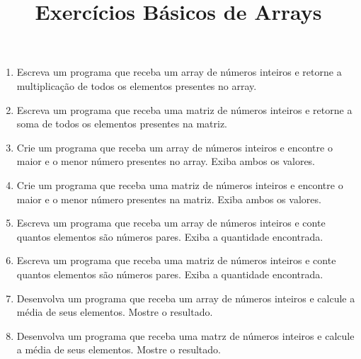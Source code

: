 \documentclass{article}
\title{Exercícios Básicos de Arrays}
\author{}
\date{}
\begin{document}
\maketitle

\begin{enumerate}
    \item Escreva um programa que receba um array de números inteiros e retorne a multiplicação de todos os elementos presentes no array.
    \item Escreva um programa que receba uma matriz de números inteiros e retorne a soma de todos os elementos presentes na matriz.
    \item Crie um programa que receba um array de números inteiros e encontre o maior e o menor número presentes no array. Exiba ambos os valores.
    \item Crie um programa que receba uma matriz de números inteiros e encontre o maior e o menor número presentes na matriz. Exiba ambos os valores.
    \item Escreva um programa que receba um array de números inteiros e conte quantos elementos são números pares. Exiba a quantidade encontrada.
    \item Escreva um programa que receba uma matriz de números inteiros e conte quantos elementos são números pares. Exiba a quantidade encontrada.
    \item Desenvolva um programa que receba um array de números inteiros e calcule a média de seus elementos. Mostre o resultado.
    \item Desenvolva um programa que receba uma matrz de números inteiros e calcule a média de seus elementos. Mostre o resultado.
\end{enumerate}
\end{document}
